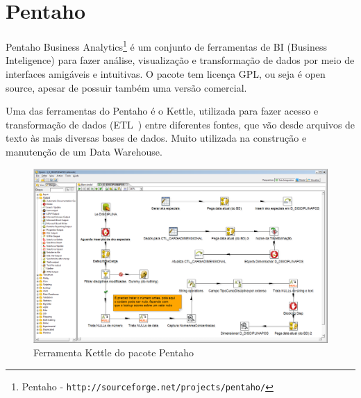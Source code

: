 \section{Pentaho}
\label{sec:pentaho}
Pentaho Business Analytics\footnote{Pentaho - \texttt{http://sourceforge.net/projects/pentaho/}} é um conjunto de ferramentas de BI (Business Inteligence) para fazer análise, visualização e transformação de dados por meio de interfaces amigáveis e intuitivas. O pacote tem licença GPL, ou seja é open source, apesar de possuir também uma versão comercial.
\par
Uma das ferramentas do Pentaho é o Kettle, utilizada para fazer acesso e transformação de dados (ETL~\cite{VR}) entre diferentes fontes, que vão desde arquivos de texto às mais diversas bases de dados. Muito utilizada na construção e manutenção de um Data Warehouse. 

\begin{figure}[H]
    \includegraphics[width=\textwidth]{figuras/pentaho.png}
    \caption{Ferramenta Kettle do pacote Pentaho}
    \label{fig:kettle}
\end{figure}

